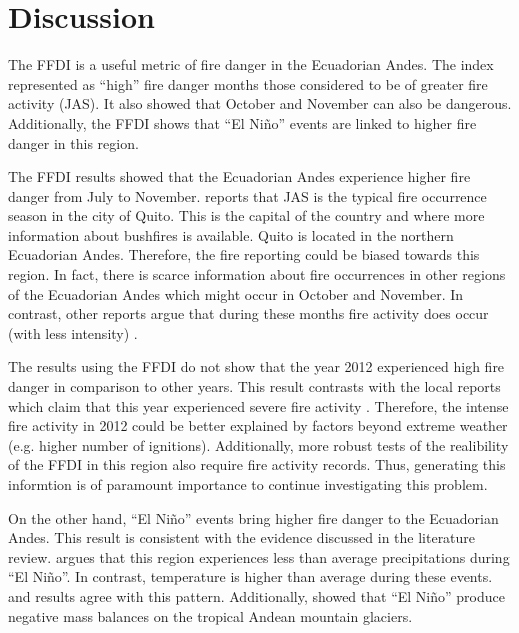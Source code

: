 \section{Discussion}

The FFDI is a useful metric of fire danger in the Ecuadorian Andes.
The index represented as ``high'' fire danger months those considered
to be of greater fire activity (JAS). It also showed that October
and November can also be dangerous. Additionally, the FFDI shows that
``El Ni\~no'' events are linked to higher fire danger in this region.

The FFDI results showed that the Ecuadorian Andes experience higher
fire danger from July to November. \citet{Estacio2012} reports that
JAS is the typical fire occurrence season in the city of Quito. This
is the capital of the country and where more information about bushfires
is available. Quito is located in the northern Ecuadorian Andes. Therefore,
the fire reporting could be biased towards this region. In fact, there
is scarce information about fire occurrences in other regions of the
Ecuadorian Andes which might occur in October and November. In contrast,
other reports argue that during these months fire activity does occur
(with less intensity) \citep{SecretariadeAmbiente2013}. 

The results using the FFDI do not show that the year 2012 experienced
high fire danger in comparison to other years. This result contrasts
with the local reports which claim that this year experienced severe
fire activity \citep{MinisteriodelAmbiente2013,SecretariadeAmbiente2013}.
Therefore, the intense fire activity in 2012 could be better explained
by factors beyond extreme weather (e.g. higher number of ignitions).
Additionally, more robust tests of the realibility of the FFDI in
this region also require fire activity records. Thus, generating this
informtion is of paramount importance to continue investigating this
problem. 

On the other hand, \textquotedblleft El Ni\~no\textquotedblright{} events
bring higher fire danger to the Ecuadorian Andes. This result is consistent
with the evidence discussed in the literature review. \citet{Garreaud2009}
argues that this region experiences less than average precipitations
during \textquotedblleft El Ni\~no\textquotedblright . In contrast,
temperature is higher than average during these events. \citet{Vuille2000}
and \citet{Francou2004} results agree with this pattern. Additionally,
\citet{Francou2004} showed that \textquotedblleft El Ni\~no\textquotedblright{}
produce negative mass balances on the tropical Andean mountain glaciers. 

